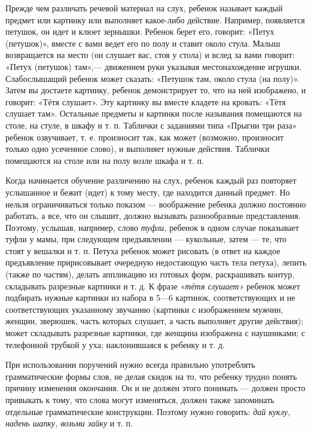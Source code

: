 \documentclass{book}
\renewcommand{\emph}[1]{\textit{#1}}
\begin{document}
Прежде чем различать речевой материал на слух, ребенок называет каждый
предмет или картинку или выполняет какое-либо действие. Например,
появляется петушок, он идет и клюет зернышки. Ребенок берет его,
говорит: «Петух (петушок)», вместе с вами ведет его по полу и ставит
около стула. Малыш возвращается на место (он слушает вас, стоя у стола)
и вслед за вами говорит: «Петух (петушок) там»,--- движением руки
указывая местонахождение игрушки. Слабослышащий ребенок может сказать:
«Петушок там, около стула (на полу)». Затем вы достаете картинку,
ребенок демонстрирует то, что на ней изображено, и говорит: «Тётя
слушает». Эту картинку вы вместе кладете на кровать: «Тётя слушает там».
Остальные предметы и картинки после называния помещаются на столе, на
стуле, в шкафу и т. п. Таблички с заданиями типа «Прыгни три раза»
ребенок озвучивает, т. е. произносит так, как может (возможно,
произносит только одно усеченное слово), и выполняет нужные действия.
Таблички помещаются на столе или на полу возле шкафа и т. п.

Когда начинается обучение различению на слух, ребенок каждый раз
повторяет услышанное и бежит (идет) к тому месту, где находится данный
предмет. Но нельзя ограничиваться только показом --- воображение ребенка
должно постоянно работать, а все, что он слышит, должно вызывать
разнообразные представления. Поэтому, услышав, например, слово
\emph{туфли,} ребенок в одном случае показывает туфли у мамы, при
следующем предъявлении --- кукольные, затем --- те, что стоят у вешалки
и т. п. Петуха ребенок может рисовать (в ответ на каждое предъявление
пририсовывает очередную недостающую часть тела петуха), лепить (также по
частям), делать аппликацию из готовых форм, раскрашивать контур,
складывать разрезные картинки и т. д. К фразе «\emph{тётя слушает»}
ребенок может подбирать нужные картинки из набора в 5---6 картинок,
соответствующих и не соответствующих указанному звучанию (картинки с
изображением мужчин, женщин, зверюшек, часть которых слушает, а часть
выполняет другие действия); может складывать разрезные картинки, где
женщина изображена с наушниками; с телефонной трубкой у уха;
наклонившаяся к ребенку и т. д.

При использовании поручений нужно всегда правильно употреблять
грамматические формы слов, не делая скидок на то, что ребенку трудно
понять причину изменения окончания. Он и не должен этого понимать ---
должен просто привыкать к тому, что слова могут изменяться, должен также
запоминать отдельные грамматические конструкции. Поэтому нужно говорить:
\emph{дай куклу, надень шапку, возьми зайку} и т. п.
\end{document}
